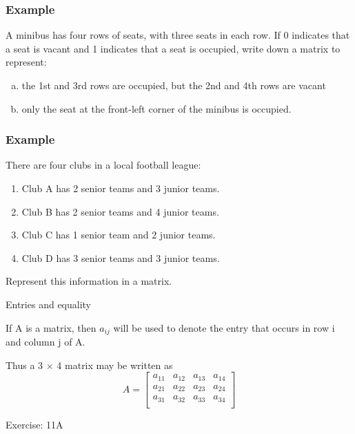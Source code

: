 \documentclass[
	11pt, %
]{beamer}
\begin{document}
\begin{frame}[t]
    \frametitle{Example}
    A minibus has four rows of seats, with three seats in each row. If 0 indicates that a seat is
    vacant and 1 indicates that a seat is occupied, write down a matrix to represent:\\
    \begin{enumerate}[(a)]
        \item the 1st and 3rd rows are occupied, but the 2nd and 4th rows are vacant
        \item only the seat at the front-left corner of the minibus is occupied.
    \end{enumerate}
\end{frame}

\begin{frame}[t]
    \frametitle{Example}
    There are four clubs in a local football league:\\
    \begin{enumerate}
        \item Club A has 2 senior teams and 3 junior teams.
        \item Club B has 2 senior teams and 4 junior teams.
        \item Club C has 1 senior team and 2 junior teams.
        \item Club D has 3 senior teams and 3 junior teams.
    \end{enumerate}
    Represent this information in a matrix.
\end{frame}

\begin{frame}{Entries and equality}
    \begin{block}{}
        If A is a matrix, then $a_{ij}$ will be used to denote the entry that occurs in row i and column j
    of A.
    \end{block}
    Thus a 3 $\times$ 4 matrix may be written as\\
    \[A = 
    \begin{bmatrix}
        a_{11} & a_{12} & a_{13} & a_{14}\\
        a_{21} & a_{22} & a_{23} & a_{24}\\
        a_{31} & a_{32} & a_{33} & a_{34}\\
    \end{bmatrix}
    \]
\end{frame}
\begin{frame}{Exercise: 11A}
\end{frame}
\end{document}
